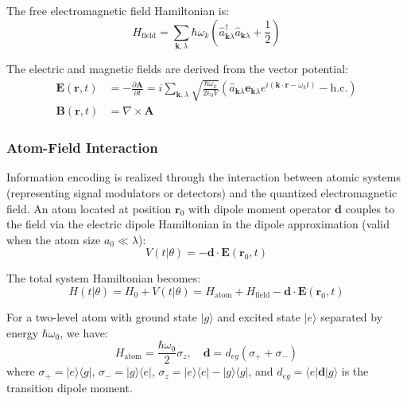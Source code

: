 \documentclass[12pt,a4paper]{article}
\begin{document}
The free electromagnetic field Hamiltonian is:
\begin{equation}
H_{\text{field}} = \sum_{\mathbf{k},\lambda} \hbar\omega_k \left(\hat{a}_{\mathbf{k}\lambda}^\dagger \hat{a}_{\mathbf{k}\lambda} + \frac{1}{2}\right)
\end{equation}

The electric and magnetic fields are derived from the vector potential:
\begin{align}
\mathbf{E}(\mathbf{r},t) &= -\frac{\partial \mathbf{A}}{\partial t} = i\sum_{\mathbf{k},\lambda} \sqrt{\frac{\hbar\omega_k}{2\epsilon_0 V}} \left(\hat{a}_{\mathbf{k}\lambda} \mathbf{e}_{\mathbf{k}\lambda} e^{i(\mathbf{k}\cdot\mathbf{r} - \omega_k t)} - \text{h.c.}\right) \\
\mathbf{B}(\mathbf{r},t) &= \nabla \times \mathbf{A}
\end{align}

\subsubsection{Atom-Field Interaction}

Information encoding is realized through the interaction between atomic systems (representing signal modulators or detectors) and the quantized electromagnetic field. An atom located at position $\mathbf{r}_0$ with dipole moment operator $\mathbf{d}$ couples to the field via the electric dipole Hamiltonian in the dipole approximation (valid when the atom size $a_0 \ll \lambda$):
\begin{equation}
V(t | \theta) = -\mathbf{d} \cdot \mathbf{E}(\mathbf{r}_0, t)
\end{equation}

The total system Hamiltonian becomes:
\begin{equation}
H(t | \theta) = H_0 + V(t | \theta) = H_{\text{atom}} + H_{\text{field}} - \mathbf{d} \cdot \mathbf{E}(\mathbf{r}_0, t)
\end{equation}

For a two-level atom with ground state $|g\rangle$ and excited state $|e\rangle$ separated by energy $\hbar\omega_0$, we have:
\begin{equation}
H_{\text{atom}} = \frac{\hbar\omega_0}{2}\sigma_z, \quad \mathbf{d} = d_{eg}(\sigma_+ + \sigma_-)
\end{equation}
where $\sigma_+ = |e\rangle\langle g|$, $\sigma_- = |g\rangle\langle e|$, $\sigma_z = |e\rangle\langle e| - |g\rangle\langle g|$, and $d_{eg} = \langle e|\mathbf{d}|g\rangle$ is the transition dipole moment.
\end{document}
